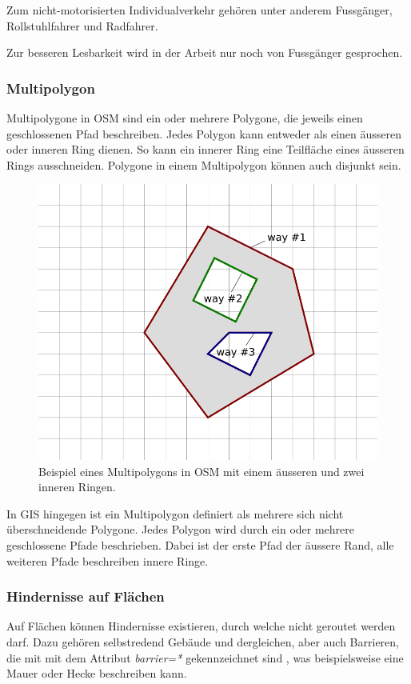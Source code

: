 Zum nicht-motorisierten Individualverkehr gehören unter anderem Fussgänger, Rollstuhlfahrer und Radfahrer.

Zur besseren Lesbarkeit wird in der Arbeit nur noch von Fussgänger gesprochen.

\subsubsection{Multipolygon}
\label{Multipolygon}

Multipolygone in \ac{OSM} sind ein oder mehrere Polygone, die jeweils einen geschlossenen Pfad beschreiben. Jedes Polygon kann entweder als einen äusseren oder inneren Ring dienen. So kann ein innerer Ring eine Teilfläche eines äusseren Rings ausschneiden. Polygone in einem Multipolygon können auch disjunkt sein. \cite{osm_wiki_multipolygon}

\begin{figure}[th]
\centering
\includegraphics[width=0.5\linewidth]{technicalreport/img/multipolygon_osm_example.png}
\caption[Multipolygon OSM Example]{Beispiel eines Multipolygons in \ac{OSM} mit einem äusseren und zwei inneren Ringen. \cite{osm_wiki_multipolygon}}
\label{fig:multipolygon_osm_example}
\end{figure}

In \ac{GIS} hingegen ist ein Multipolygon definiert als mehrere sich nicht überschneidende Polygone. Jedes Polygon wird durch ein oder mehrere geschlossene Pfade beschrieben. Dabei ist der erste Pfad der äussere Rand, alle weiteren Pfade beschreiben innere Ringe. \cite{opengis_simple_features}

\subsubsection{Hindernisse auf Flächen}
\label{Hindernisse in Flächen}

Auf Flächen können Hindernisse existieren, durch welche nicht geroutet werden darf. Dazu gehören selbstredend Gebäude und dergleichen, aber auch Barrieren, die mit  mit dem Attribut \textit{barrier=*} gekennzeichnet sind \cite{osm_wiki_barrier}, was beispielsweise eine Mauer oder Hecke beschreiben kann.

